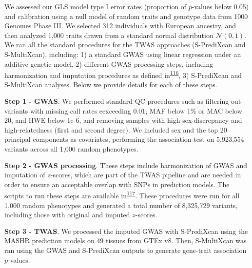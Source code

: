 \documentclass[
  a4paper,
]{article}
\begin{document}
We assessed our GLS model type I error rates (proportion of \(p\)-values below 0.05) and calibration using a null model of random traits and genotype data from 1000 Genomes Phase III.
We selected 312 individuals with European ancestry, and then analyzed 1,000 traits drawn from a standard normal distribution \(\mathcal{N}(0,1)\).
We ran all the standard procedures for the TWAS approaches (S-PrediXcan and S-MultiXcan), including:
1) a standard GWAS using linear regression under an additive genetic model,
2) different GWAS processing steps, including harmonization and imputation procedures as defined in\textsuperscript{\protect\hyperlink{ref-SiobXsoB}{116}},
3) S-PrediXcan and S-MultiXcan analyses.
Below we provide details for each of these steps.

\textbf{Step 1 - GWAS}. We performed standard QC procedures such as
filtering out variants with missing call rates eexceeding 0.01, MAF below 1\% or MAC below 20, and HWE below 1e-6,
and removing samples with high sex-discrepancy and high-relatedness (first and second degree).
We included sex and the top 20 principal components as covariates, performing the association test on 5,923,554 variants across all 1,000 random phenotypes.

\textbf{Step 2 - GWAS processing}. These steps include harmonization of GWAS and imputation of \(z\)-scores, which are part of the TWAS pipeline and are needed in order to ensure an acceptable overlap with SNPs in prediction models.
The scripts to run these steps are available in\textsuperscript{\protect\hyperlink{ref-GPHGnFRN}{117}}.
These procedures were run for all 1,000 random phenotypes and generated a total number of 8,325,729 variants, including those with original and imputed \(z\)-scores.

\textbf{Step 3 - TWAS}. We processed the imputed GWAS with S-PrediXcan using the MASHR prediction models on 49 tissues from GTEx v8.
Then, S-MultiXcan was ran using the GWAS and S-PrediXcan outputs to generate gene-trait association \(p\)-values.
\end{document}
